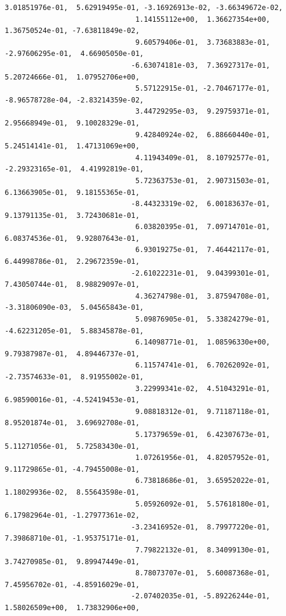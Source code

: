 \documentclass[11pt]{article}
\begin{document}
\begin{Verbatim}[commandchars=\\\{\}]
                               3.01851976e-01,  5.62919495e-01, -3.16926913e-02, -3.66349672e-02,
                               1.14155112e+00,  1.36627354e+00,  1.36750524e-01, -7.63811849e-02,
                               9.60579406e-01,  3.73683883e-01, -2.97606295e-01,  4.66905050e-01,
                              -6.63074181e-03,  7.36927317e-01,  5.20724666e-01,  1.07952706e+00,
                               5.57122915e-01, -2.70467177e-01, -8.96578728e-04, -2.83214359e-02,
                               3.44729295e-03,  9.29759371e-01,  2.95668949e-01,  9.10028329e-01,
                               9.42840924e-02,  6.88660440e-01,  5.24514141e-01,  1.47131069e+00,
                               4.11943409e-01,  8.10792577e-01, -2.29323165e-01,  4.41992819e-01,
                               5.72363753e-01,  2.90731503e-01,  6.13663905e-01,  9.18155365e-01,
                              -8.44323319e-02,  6.00183637e-01,  9.13791135e-01,  3.72430681e-01,
                               6.03820395e-01,  7.09714701e-01,  6.08374536e-01,  9.92807643e-01,
                               6.93019275e-01,  7.46442117e-01,  6.44998786e-01,  2.29672359e-01,
                              -2.61022231e-01,  9.04399301e-01,  7.43050744e-01,  8.98829097e-01,
                               4.36274798e-01,  3.87594708e-01, -3.31806090e-03,  5.04565843e-01,
                               5.09876905e-01,  5.33824279e-01, -4.62231205e-01,  5.88345878e-01,
                               6.14098771e-01,  1.08596330e+00,  9.79387987e-01,  4.89446737e-01,
                               6.11574741e-01,  6.70262092e-01, -2.73574633e-01,  8.91955002e-01,
                               3.22999341e-02,  4.51043291e-01,  6.98590016e-01, -4.52419453e-01,
                               9.08818312e-01,  9.71187118e-01,  8.95201874e-01,  3.69692708e-01,
                               5.17379659e-01,  6.42307673e-01,  5.11271056e-01,  5.72583430e-01,
                               1.07261956e-01,  4.82057952e-01,  9.11729865e-01, -4.79455008e-01,
                               6.73818686e-01,  3.65952022e-01,  1.18029936e-02,  8.55643598e-01,
                               5.05926092e-01,  5.57618180e-01,  6.17982964e-01, -1.27977361e-02,
                              -3.23416952e-01,  8.79977220e-01,  7.39868710e-01, -1.95375171e-01,
                               7.79822132e-01,  8.34099130e-01,  3.74270985e-01,  9.89947449e-01,
                               8.78073707e-01,  5.60087368e-01,  7.45956702e-01, -4.85916029e-01,
                              -2.07402035e-01, -5.89226244e-01,  1.58026509e+00,  1.73832906e+00,

\end{Verbatim}
\end{document}
